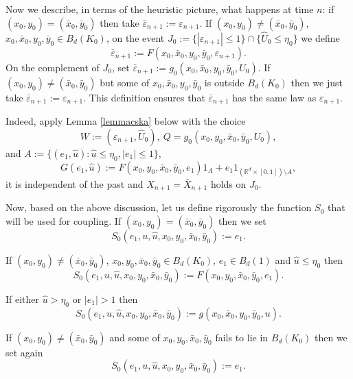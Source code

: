 \documentclass{article}
\begin{document}
Now we describe, in terms of the heuristic picture, what happens at time $n$:
if $(x_0,y_0)=(\bar{x}_0,\bar{y}_0)$
then take $\bar{\varepsilon}_{n+1}:=\varepsilon_{n+1}$.
If $(x_0,y_0)\neq (\bar{x}_0,\bar{y}_0)$, $x_0,\bar{x}_0,y_0,\bar{y}_0\in B_d(K_{0})$, on the event
$J_{0}:=\{|\varepsilon_{n+1}|\leq 1\}\cap \{\hat{U}_{0}\leq \eta_{0}\}$ 
we define 
$$\bar{\varepsilon}_{n+1}:=F(x_{0},\bar{x}_{0},y_{0},\bar{y}_{0},\varepsilon_{n+1}).
$$ On the complement of $J_{0}$,
set $\bar{\varepsilon}_{n+1}:=g_0(x_{0},\bar{x}_{0},y_{0},\bar{y}_{0},U_{0})$. 
If $(x_0,y_0)\neq (\bar{x}_0,\bar{y}_0)$ but some of $x_0,\bar{x}_0,y_0,\bar{y}_0$ is outside $B_d(K_{0})$ then we just take 
$\bar{\varepsilon}_{n+1}:=\varepsilon_{n+1}$.
This definition
ensures that $\bar{\varepsilon}_{n+1}$ has the same law as $\varepsilon_{n+1}$.

Indeed, apply Lemma \ref{lemmacska} below
with the choice $$W:=(\varepsilon_{n+1},\hat{U}_{0}),\ Q=g_{0}(x_{0},y_{0},\bar{x}_{0},\bar{y}_{0},U_{0}),$$
and 
$A:=\{(e_{1},\hat{u}):\hat{u}\leq \eta_{0}, |e_{1}|\leq 1\}$, 
$$
G(e_{1},\hat{u}):=F(x_{0},y_{0},\bar{x}_{0},\bar{y}_{0},e_{1})1_{A}+e_{1}1_{(\mathbb{R}^{d}\times [0,1])\setminus A},$$
it is independent of the past and $X_{n+1} \!=\! \bar{X}_{n+1}$ holds on $J_{0}$.

Now, based on the above discussion, let us define {rigorously} the function $S_{0}$ that will be used for coupling.
If $(x_{0},y_{0})=(\bar{x}_{0},\bar{y}_{0})$ then we set $$
S_{0}(e_1,u,\hat{u},x_{0},y_{0},\bar{x}_{0},\bar{y}_{0}):=e_1.
$$ 

If $(x_{0},y_{0})\neq (\bar{x}_{0},\bar{y}_{0})$, $x_{0},y_{0},\bar{x}_{0},\bar{y}_{0}\in B_d(K_{0})$,
$e_1\in B_d(1)$ and
$\hat{u}\leq \eta_{0}$ then
$$S_0(e_1,u,\hat{u},x_{0},y_{0},\bar{x}_{0},\bar{y}_{0}):=F(x_{0},y_{0},\bar{x}_{0},\bar{y}_{0},e_1).
$$

If either $\hat{u}>\eta_{0}$ or $|e_{1}|>1$ then
$$
S_0(e_1,u,\hat{u},x_{0},y_{0},\bar{x}_{0},\bar{y}_{0}):=g(x_{0},\bar{x}_{0},y_{0},\bar{y}_{0},u).
$$

If $(x_{0},y_{0})\neq (\bar{x}_{0},\bar{y}_{0})$ and some of $x_{0},y_{0},\bar{x}_{0},\bar{y}_{0}$ fails to
lie in $B_d(K_{0})$
then we set again
$$S_0(e_1,u,\hat{u},x_{0},y_{0},\bar{x}_{0},\bar{y}_{0}):=e_{1}.$$
\end{document}
